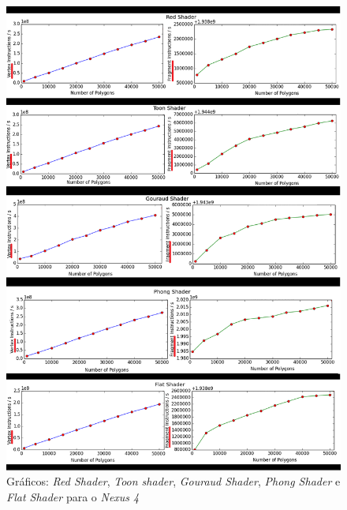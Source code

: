 	\begin{figure}[ht]
	\centering
		\includegraphics[keepaspectratio=true,scale=0.55]{figuras/red.png}
	\caption{Gráficos: \textit{Red Shader}, \textit{Toon shader}, \textit{Gouraud Shader},  \textit{Phong Shader} e  \textit{Flat Shader} para o \textit{Nexus 4}}
	\label{nexus1}
	\end{figure}


